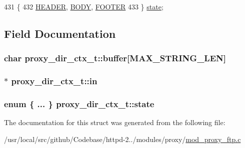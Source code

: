 \begin{DoxyCode}
431          \{
432         \hyperlink{structproxy__dir__ctx__t_aa2926737f6993b3002d021e881b105d5a8c44afff6acf5e1e091f628b5811998d}{HEADER}, \hyperlink{structproxy__dir__ctx__t_aa2926737f6993b3002d021e881b105d5aa58184ef41f4e03de3b4e8f26ca2d51a}{BODY}, \hyperlink{structproxy__dir__ctx__t_aa2926737f6993b3002d021e881b105d5a9f18bcb4ea8f1ddc933808b9024dacd3}{FOOTER}
433     \}    \hyperlink{structproxy__dir__ctx__t_a957051b07a6f492736a5bd028e949d4e}{state};
\end{DoxyCode}


\subsection{Field Documentation}
\subsubsection[{\texorpdfstring{buffer}{buffer}}]{\setlength{\rightskip}{0pt plus 5cm}char proxy\+\_\+dir\+\_\+ctx\+\_\+t\+::buffer\mbox{[}{\bf M\+A\+X\+\_\+\+S\+T\+R\+I\+N\+G\+\_\+\+L\+EN}\mbox{]}}\hypertarget{structproxy__dir__ctx__t_a73d3948ed8e032d421c0b517f7f2400d}{}\label{structproxy__dir__ctx__t_a73d3948ed8e032d421c0b517f7f2400d}
\subsubsection[{\texorpdfstring{in}{in}}]{$\ast$ proxy\+\_\+dir\+\_\+ctx\+\_\+t\+::in}\hypertarget{structproxy__dir__ctx__t_a935dc3589fcc530d8ef4fed3af8381d5}{}\label{structproxy__dir__ctx__t_a935dc3589fcc530d8ef4fed3af8381d5}
\subsubsection[{\texorpdfstring{state}{state}}]{\setlength{\rightskip}{0pt plus 5cm}enum \{ ... \}      proxy\+\_\+dir\+\_\+ctx\+\_\+t\+::state}\hypertarget{structproxy__dir__ctx__t_a957051b07a6f492736a5bd028e949d4e}{}\label{structproxy__dir__ctx__t_a957051b07a6f492736a5bd028e949d4e}


The documentation for this struct was generated from the following file\+:\begin{DoxyCompactItemize}
\item 
/usr/local/src/github/\+Codebase/httpd-\/2../modules/proxy/\hyperlink{mod__proxy__ftp_8c}{mod\+\_\+proxy\+\_\+ftp.\+c}\end{DoxyCompactItemize}
